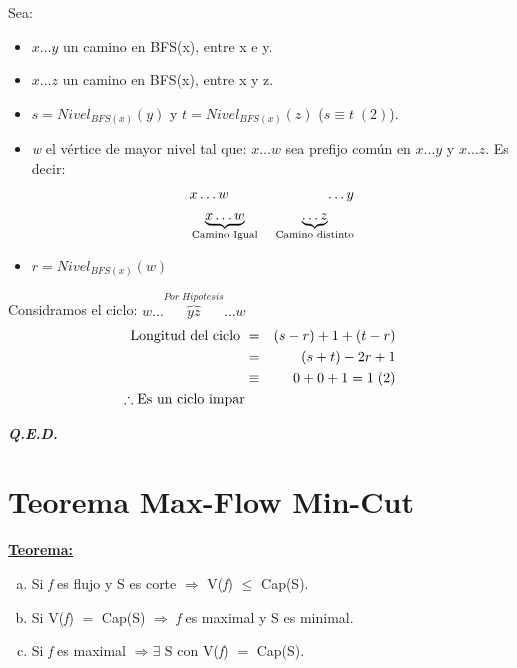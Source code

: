 \documentclass[12pt,a4paper]{report}
\newcommand{\QED}{\hfill \textit{\textbf{Q.E.D.}}}
\begin{document}
\begin{itemize}
\begin{itemize}
							\vspace{5mm}
							\par Sea:
							\begin{itemize}
								\item $x \dotsc y$ un camino en BFS(x), entre x e y.
								\item $x \dotsc z$ un camino en BFS(x), entre x y z.
								\item $s = Nivel_{BFS(x)}(y)$ y $t = Nivel_{BFS(x)}(z)$ ($s \equiv t \; (2)$).
								\item \textit{w} el vértice de mayor nivel tal que: $x \dotsc w$ sea prefijo común en $x \dotsc y$ y $x \dotsc z$. Es decir:
									\begin{eqnarray}
										\nonumber &x \dotsc w & \qquad \dotsc y \\
										\nonumber &\underbrace{x \dotsc w}_{\textup{Camino Igual}}& \; \underbrace{\dotsc z}_{\textup{Camino distinto}}
									\end{eqnarray}
								\item $r = Nivel_{BFS(x)}(w)$
							\end{itemize}

						\par Considramos el ciclo: $w \dotsc \overbrace{y z}^{Por \; Hipotesis} \dotsc w$
						\begin{eqnarray}
							\nonumber \textup{Longitud del ciclo } &=& (s - r) + 1 + (t - r) \\
							\nonumber &=& (s + t) - 2r + 1 \\
							\nonumber &\equiv & 0 + 0 + 1 = 1 \; (2) \\
							\nonumber \therefore \textup{Es un ciclo impar}
						\end{eqnarray}
					\end{itemize}
			\end{itemize}

		\QED

	\section{Teorema Max-Flow Min-Cut}
		\textbf{\underline{Teorema:}}
			\begin{enumerate}[a)]
				\item Si \textit{f} es flujo y S es corte $\Rightarrow$ V(\textit{f}) $\leq$ Cap(S).
				\item Si V(\textit{f}) $=$ Cap(S) $\Rightarrow$ \textit{f} es maximal y S es minimal.
				\item Si \textit{f} es maximal $\Rightarrow \exists$ S con V(\textit{f}) $=$ Cap(S).
			\end{enumerate}
\end{document}

